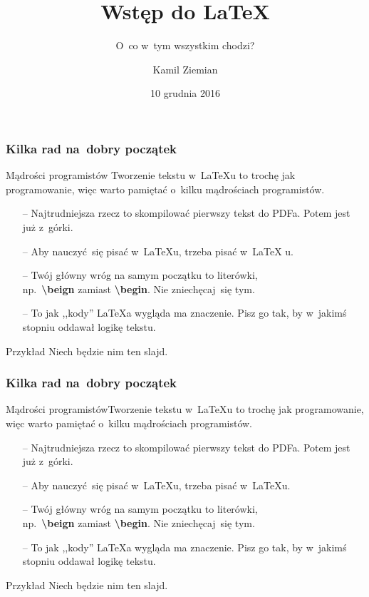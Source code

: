 \documentclass{beamer} \mode<presentation>
\title[]{Wstęp do \LaTeX} %
\subtitle{O~co w~tym wszystkim chodzi?}
\author{Kamil Ziemian}
\date[10 XI 2016]{10 grudnia 2016}
\newcommand{\tb}{\textbf}
\newcommand{\tbs}{\textbackslash}
\begin{document}
\begin{frame}
  \frametitle{Kilka rad na~dobry początek}

  \begin{block}{Mądrości programistów}
    Tworzenie tekstu w~\LaTeX u to trochę jak programowanie, więc
    warto pamiętać o~kilku mądrościach programistów.
    \begin{itemize}
    \item[--] Najtrudniejsza rzecz to skompilować pierwszy tekst do
      PDFa. Potem jest już z~górki.
    \item[--] Aby nauczyć~się pisać w~\LaTeX u, trzeba pisać w~\LaTeX
      u.
    \item[--] Twój główny wróg na samym początku to literówki, \\
      np.~\tb{\tbs beign} zamiast \tb{\tbs begin}. Nie zniechęcaj~się
      tym.
    \item[--] To jak ,,kody'' \LaTeX a wygląda ma znaczenie. Pisz go tak, by
      w~jakimś stopniu oddawał logikę tekstu.
    \end{itemize}
  \end{block}

  \begin{block}{Przykład}       %
    Niech będzie nim ten slajd.
  \end{block}
  
\end{frame}



\begin{frame}\frametitle{Kilka rad na~dobry początek}\begin{block}{Mądrości programistów}Tworzenie tekstu w~\LaTeX u to trochę jak programowanie, więc warto pamiętać o~kilku mądrościach programistów.\begin{itemize}\item[--] Najtrudniejsza rzecz to skompilować pierwszy tekst do PDFa. Potem jest już z~górki.\item[--] Aby nauczyć~się pisać w~\LaTeX u, trzeba pisać w~\LaTeX u.\item[--] Twój główny wróg na samym początku to literówki, \\ np.~\tb{\tbs beign} zamiast \tb{\tbs begin}. Nie zniechęcaj~się tym.\item[--] To jak ,,kody'' \LaTeX a wygląda ma znaczenie. Pisz go tak, by w~jakimś stopniu oddawał logikę tekstu. \end{itemize}\end{block}\begin{block}{Przykład}       %
    Niech będzie nim ten slajd.\end{block}\end{frame}
\end{document}
